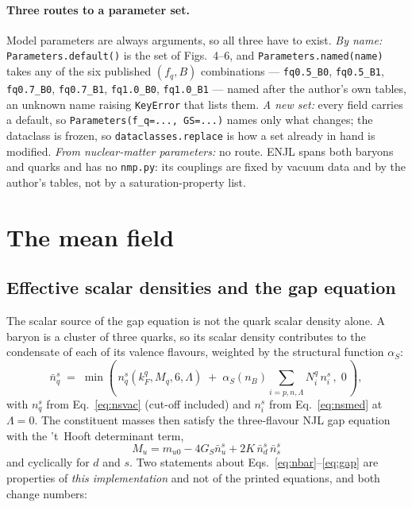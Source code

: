 \documentclass[aps,prc,onecolumn,superscriptaddress,nofootinbib,10pt]{revtex4-2}
\newcommand{\nB}{n_B}
\newcommand{\nbs}{\bar{n}^s}
\newcommand{\kF}{k_F}
\begin{document}
\paragraph{Three routes to a parameter set.} Model parameters are always
arguments, so all three have to exist. \emph{By name:}
\texttt{Parameters.default()} is the set of Figs.~4--6, and
\texttt{Parameters.named(name)} takes any of the six published $(f_q, B)$
combinations --- \texttt{fq0.5\_B0}, \texttt{fq0.5\_B1}, \texttt{fq0.7\_B0},
\texttt{fq0.7\_B1}, \texttt{fq1.0\_B0}, \texttt{fq1.0\_B1} --- named after the
author's own tables, an unknown name raising \texttt{KeyError} that lists them.
\emph{A new set:} every field carries a default, so
\texttt{Parameters(f\_q=..., GS=...)} names only what changes; the dataclass is
frozen, so \texttt{dataclasses.replace} is how a set already in hand is
modified. \emph{From nuclear-matter parameters:} no route. ENJL spans both
baryons and quarks and has no \texttt{nmp.py}: its couplings are fixed by
vacuum data and by the author's tables, not by a saturation-property list.

\section{The mean field}
\label{sec:meanfield}

\subsection{Effective scalar densities and the gap equation}

The scalar source of the gap equation is not the quark scalar density alone.
A baryon is a cluster of three quarks, so its scalar density contributes to
the condensate of each of its valence flavours, weighted by the structural
function $\alpha_S$:
%
\begin{equation}
\nbs_q \;=\; \min\!\left(\,
   n^s_q(\kF^q, M_q, 6, \Lambda)
   \;+\; \alpha_S(\nB) \sum_{i = p, n, \Lambda} N^q_i\, n^s_i
   \,,\; 0 \,\right) ,
\label{eq:nbar}
\end{equation}
%
with $n^s_q$ from Eq.~\eqref{eq:nsvac} (cut-off included) and $n^s_i$ from
Eq.~\eqref{eq:nsmed} at $\Lambda = 0$. The constituent masses then satisfy the
three-flavour NJL gap
equation~\cite{NambuJonaLasinio1961,RehbergKlevanskyHufner1996} with the
't~Hooft determinant term,
%
\begin{equation}
\boxed{\;
M_u = m_{u0} - 4 G_S \nbs_u + 2 K\, \nbs_d\, \nbs_s \;}
\label{eq:gap}
\end{equation}
%
and cyclically for $d$ and $s$. Two statements about
Eqs.~\eqref{eq:nbar}--\eqref{eq:gap} are properties of \emph{this
implementation} and not of the printed equations, and both change numbers:
\end{document}
